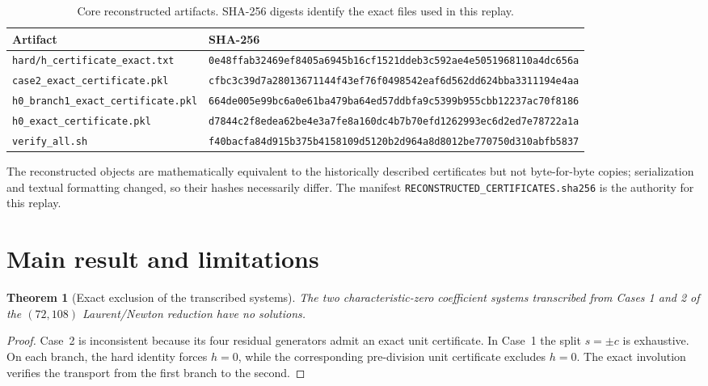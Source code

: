 \documentclass[11pt,a4paper]{article}
\newtheorem{theorem}{Theorem}[section]
\theoremstyle{remark}
\begin{document}
\begin{table}[ht]
\centering
\caption{Core reconstructed artifacts. SHA-256 digests identify the exact files used in this replay.}
\scriptsize
\begin{tabularx}{\textwidth}{@{}>{\raggedright\arraybackslash}p{}>{\raggedright\arraybackslash}X@{}}
\toprule
Artifact & SHA-256 \\
\midrule
\texttt{hard/h\_certificate\_exact.txt} & \texttt{0e48ffab32469ef8405a6945b16cf1521ddeb3c592ae4e5051968110a4dc656a} \\
\texttt{case2\_exact\_certificate.pkl} & \texttt{cfbc3c39d7a28013671144f43ef76f0498542eaf6d562dd624bba3311194e4aa} \\
\texttt{h0\_branch1\_exact\_certificate.pkl} & \texttt{664de005e99bc6a0e61ba479ba64ed57ddbfa9c5399b955cbb12237ac70f8186} \\
\texttt{h0\_exact\_certificate.pkl} & \texttt{d7844c2f8edea62be4e3a7fe8a160dc4b7b70efd1262993ec6d2ed7e78722a1a} \\
\texttt{verify\_all.sh} & \texttt{f40bacfa84d915b375b4158109d5120b2d964a8d8012be770750d310abfb5837} \\
\bottomrule
\end{tabularx}
\end{table}

The reconstructed objects are mathematically equivalent to the historically described certificates but not byte-for-byte copies; serialization and textual formatting changed, so their hashes necessarily differ. The manifest \texttt{RECONSTRUCTED\_CERTIFICATES.sha256} is the authority for this replay.

\section{Main result and limitations}

\begin{theorem}[Exact exclusion of the transcribed systems]
The two characteristic-zero coefficient systems transcribed from Cases 1 and 2 of the $(72,108)$ Laurent/Newton reduction have no solutions.
\end{theorem}
\begin{proof}
Case~2 is inconsistent because its four residual generators admit an exact unit certificate. In Case~1 the split $s=\pm c$ is exhaustive. On each branch, the hard identity forces $h=0$, while the corresponding pre-division unit certificate excludes $h=0$. The exact involution verifies the transport from the first branch to the second.
\end{proof}
\end{document}
